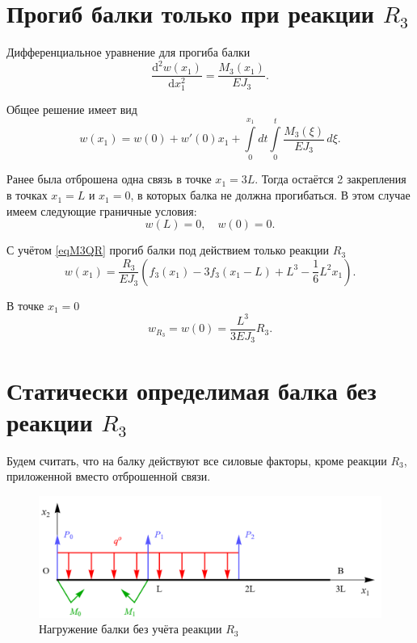 \documentclass[12pt, a4paper]{article}
\begin{document}
	\section{Прогиб балки только при реакции $R_3$} 
	
	Дифференциальное уравнение для прогиба балки
	\[
	\dfrac{\mathrm{d}^2 w(x_1)}{\mathrm{d} x_1^2} = \dfrac{M_3(x_1)}{E J_3}.
	\]
	
	Общее решение имеет вид
	\vspace{-0.5em}
	\begin{equation}
		w(x_1) = w(0) + w'(0) x_1 + \int\limits_0^{x_1} \! dt \int\limits_0^t \dfrac{M_3(\xi)}{E J_3} \, d \xi.
		\label{eqw}
	\end{equation}
	
	Ранее была отброшена одна связь в точке $x_1 = 3L$. Тогда остаётся 2 закрепления в точках $x_1 = L$ и $x_1 = 0$, в которых балка не должна прогибаться. В этом случае имеем следующие граничные условия:
	\vspace{-0.5em}
	\begin{equation}
		w(L) = 0, \quad w(0) = 0.
		\label{eqwGU}
	\end{equation}
	
	\vspace{-0.5em}
	
	С учётом \eqref{eqM3QR} прогиб балки под действием только реакции $R_3$
	\begin{equation}
		w(x_1) = \dfrac{R_3}{E J_3} \left( f_3(x_1) - 3 f_3(x_1 - L) + L^3 - \dfrac{1}{6} L^2 x_1 \right).
		\label{eqwR}
	\end{equation}
	
	В точке $x_1 = 0$
	\begin{equation}
		w_{R_3} = w(0) = \dfrac{L^3}{3 E J_3} R_3.
		\label{eqwR3}
	\end{equation}
	
	\newpage
	
	\section{Статически определимая балка без реакции $R_3$} 
	
	Будем считать, что на балку действуют все силовые факторы, кроме реакции $R_3$, приложенной вместо отброшенной связи.
	
	\begin{figure}[!h]
		\centering
		\includegraphics[width=0.75\linewidth]{plot-7}
		\caption{Нагружение балки без учёта реакции $R_3$}
	\end{figure}
	
\end{document}
